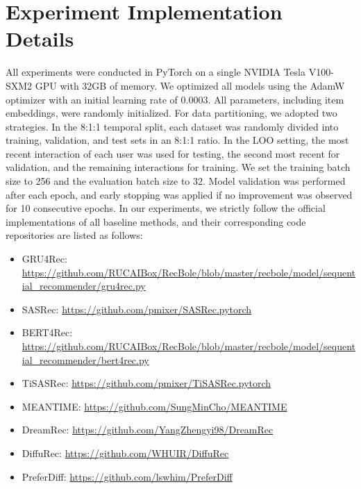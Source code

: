 \documentclass[sigconf,nonacm]{acmart}
\begin{document}
\section{Experiment Implementation Details}
\label{app:exp}
All experiments were conducted in PyTorch on a single NVIDIA Tesla V100-SXM2 GPU with 32GB of memory. We optimized all models using the AdamW optimizer with an initial learning rate of 0.0003. All parameters, including item embeddings, were randomly initialized.  
For data partitioning, we adopted two strategies. In the 8:1:1 temporal split, each dataset was randomly divided into training, validation, and test sets in an 8:1:1 ratio. In the LOO setting, the most recent interaction of each user was used for testing, the second most recent for validation, and the remaining interactions for training.  
We set the training batch size to 256 and the evaluation batch size to 32. Model validation was performed after each epoch, and early stopping was applied if no improvement was observed for 10 consecutive epochs.
In our experiments, we strictly follow the official implementations of all baseline methods, and their corresponding code repositories are listed as follows:
\begin{itemize}[leftmargin=*,itemsep=0.5pt,topsep=2.5pt]
    \item GRU4Rec: \url{https://github.com/RUCAIBox/RecBole/blob/master/recbole/model/sequential_recommender/gru4rec.py}
    \item SASRec: \url{https://github.com/pmixer/SASRec.pytorch}
    \item BERT4Rec: \url{https://github.com/RUCAIBox/RecBole/blob/master/recbole/model/sequential_recommender/bert4rec.py}
    \item TiSASRec: \url{https://github.com/pmixer/TiSASRec.pytorch}
    \item MEANTIME: \url{https://github.com/SungMinCho/MEANTIME}
    \item DreamRec: \url{https://github.com/YangZhengyi98/DreamRec}
    \item DiffuRec: \url{https://github.com/WHUIR/DiffuRec}
    \item PreferDiff: \url{https://github.com/lswhim/PreferDiff}
\end{itemize}
\end{document}
